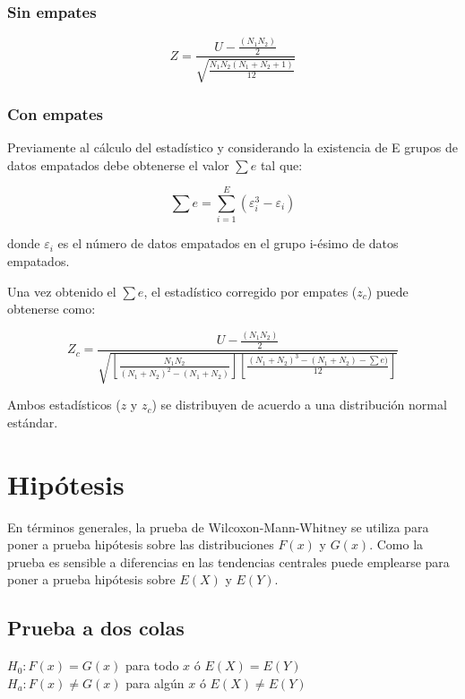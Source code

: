 \documentclass[]{book}
\theoremstyle{definition}
\theoremstyle{definition}
\theoremstyle{definition}
\theoremstyle{remark}
\begin{document}
\hypertarget{sin-empates-1}{%
\subsubsection{Sin empates}\label{sin-empates-1}}

\[Z=\frac{U-\frac{(N_1 N_2)}{2}}{\sqrt{\frac{N_1 N_2 (N_1+N_2+1)}{12}}}\]

\hypertarget{con-empates}{%
\subsubsection{Con empates}\label{con-empates}}

Previamente al cálculo del estadístico y considerando la existencia de E
grupos de datos empatados debe obtenerse el valor \(\sum e\) tal que:

\[\sum e=\sum_{i=1}^E(\varepsilon_i^3-\varepsilon_i ) \]

donde \(\varepsilon_i\) es el número de datos empatados en el grupo
i-ésimo de datos empatados.

Una vez obtenido el \(\sum e\), el estadístico corregido por empates
(\(z_c\)) puede obtenerse como:

\[Z_c=\frac{U-\frac{(N_1 N_2)}{2}}
{\sqrt{\left [\frac{N_1N_2}{(N_1+N_2)^2-(N_1+N_2)}\right ]\left [\frac{(N_1 + N_2)^3 -(N_1+N_2)-\sum e)}{12}\right ]}}\]

Ambos estadísticos (\(z\) y \(z_c\)) se distribuyen de acuerdo a una
distribución normal estándar.

\hypertarget{hipotesis}{%
\section{Hipótesis}\label{hipotesis}}

En términos generales, la prueba de Wilcoxon-Mann-Whitney se utiliza
para poner a prueba hipótesis sobre las distribuciones \(F(x)\) y
\(G(x)\). Como la prueba es sensible a diferencias en las tendencias
centrales puede emplearse para poner a prueba hipótesis sobre \(E(X)\) y
\(E(Y)\).

\hypertarget{prueba-a-dos-colas}{%
\subsection{Prueba a dos colas}\label{prueba-a-dos-colas}}

\(H_0: F(x)=G(x)\) para todo \(x\) ó \(E(X)=E(Y)\)\\
\(H_a: F(x)≠G(x)\) para algún \(x\) ó \(E(X)≠E(Y)\)
\end{document}

